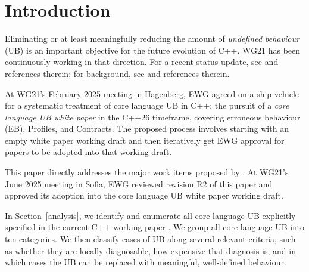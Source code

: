 
\pagebreak
\tableofcontents*
\pagebreak






\section{Introduction}
\label{intro}

Eliminating or at least meaningfully reducing the amount of \emph{undefined behaviour} (UB) is an important objective for the future evolution of C++. WG21 has been continuously working in that direction. For a recent status update, see \cite{Sutter2025} and references therein; for background, see \cite{Sutter2024} and references therein.

At WG21's February 2025 meeting in Hagenberg, EWG agreed on a ship vehicle for a systematic
treatment of core language UB in C++: the pursuit of a \emph{core language UB white paper} \cite{P3656R1} in the C++26 timeframe, covering erroneous behaviour (EB), Profiles, and Contracts. The proposed process involves starting with an empty white paper working draft and then iteratively get EWG approval for papers to be adopted into that working draft.

This paper directly addresses the major work items proposed by \cite{P3656R1}. At WG21's June 2025 meeting in Sofia, EWG reviewed revision R2 of this paper and approved its adoption into the core language UB white paper working draft. 

In Section~\ref{analysis}, we identify and enumerate all core language UB explicitly specified in the current C++ working paper \cite{N5008}. We group all core language UB into ten categories. We then classify cases of UB along several relevant criteria, such as whether they are locally diagnosable, how expensive that diagnosis is, and in which cases the UB can be replaced with meaningful, well-defined behaviour.

